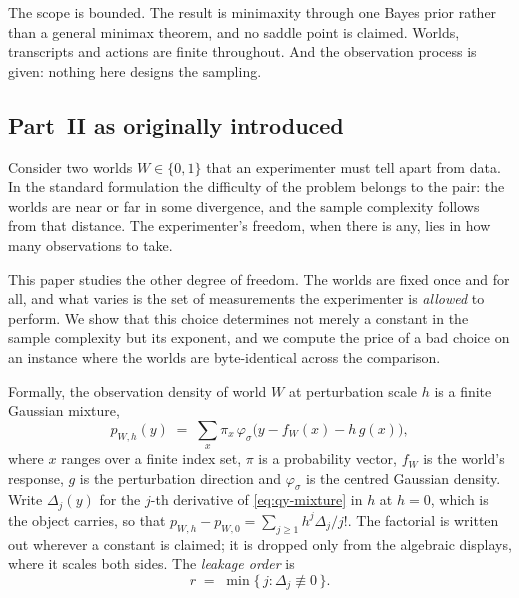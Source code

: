 The scope is bounded. The result is minimaxity through one Bayes prior rather than a general
minimax theorem, and no saddle point is claimed. Worlds, transcripts and actions are finite
throughout. And the observation process is given: nothing here designs the sampling.


\subsection{Part~II as originally introduced}


Consider two worlds $W\in\{0,1\}$ that an experimenter must tell apart from data. In the
standard formulation the difficulty of the problem belongs to the pair: the worlds are near
or far in some divergence, and the sample complexity follows from that distance. The
experimenter's freedom, when there is any, lies in how many observations to take.

This paper studies the other degree of freedom. The worlds are fixed once and for all, and
what varies is the set of measurements the experimenter is \emph{allowed} to perform. We
show that this choice determines not merely a constant in the sample complexity but its
exponent, and we compute the price of a bad choice on an instance where the worlds are
byte-identical across the comparison.

Formally, the observation density of world $W$ at perturbation scale $h$ is a finite
Gaussian mixture,
\begin{equation}
p_{W,h}(y)\;=\;\sum_{x}\pi_{x}\,
   \varphi_{\sigma}\bigl(y-f_{W}(x)-h\,g(x)\bigr),
\label{eq:qy-mixture}
\end{equation}
where $x$ ranges over a finite index set, $\pi$ is a probability vector, $f_{W}$ is the
world's response, $g$ is the perturbation direction and $\varphi_{\sigma}$ is the centred
Gaussian density. Write $\Delta_{j}(y)$ for the $j$-th derivative of \eqref{eq:qy-mixture} in
$h$ at $h=0$, which is the object  carries, so that
$p_{W,h}-p_{W,0}=\sum_{j\ge1}h^{j}\Delta_{j}/j!$. The factorial is written out wherever a
constant is claimed; it is dropped only from the algebraic displays, where it scales both
sides. The \emph{leakage order} is
\begin{equation}
r \;=\; \min\{\, j : \Delta_{j}\not\equiv 0 \,\}.
\label{eq:qy-order}
\end{equation}

